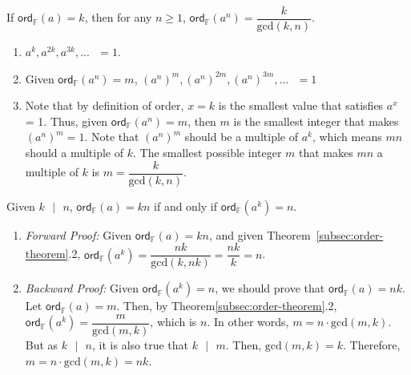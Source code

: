 \begin{tcolorbox}[title={\textbf{\tboxtheorem{\ref*{subsec:order-theorem}.2} Order Property (II)}}]
If $\textsf{ord}_{\mathbb{F}}(a) = k$, then for any $n \geq 1$, $\textsf{ord}_{\mathbb{F}}(a^n) = \dfrac{k} {\text{gcd}(k, n)}$.
\end{tcolorbox}
\begin{myproof}
    \begin{enumerate}
    \item $a^k, a^{2k}, a^{3k}, ... \text{ } = 1$. 
    \item Given $\textsf{ord}_{\mathbb{F}}(a^n) = m$, $(a^n)^m, (a^n)^{2m}, (a^n)^{3m}, ... \text{ } = 1$ 
    \item Note that by definition of order, $x=k$ is the smallest value that satisfies $a^x$ = 1. Thus, given $\textsf{ord}_{\mathbb{F}}(a^n) = m$, then $m$ is the smallest integer that makes $(a^n)^m = 1$. Note that $(a^n)^m$ should be a multiple of $a^k$, which means $mn$ should a multiple of $k$. The smallest possible integer $m$ that makes $mn$ a multiple of $k$ is $m = \dfrac{k}{\text{gcd}(k, n)}$. 
    \end{enumerate}
\end{myproof}

\begin{tcolorbox}[title={\textbf{\tboxtheorem{\ref*{subsec:order-theorem}.3} Order Property (III)}}]
Given $k \text{ } | \text{ } n$, $\textsf{ord}_{\mathbb{F}}(a) = kn$ if and only if $\textsf{ord}_{\mathbb{F}}(a^k) = n$.
\end{tcolorbox}
\begin{myproof}
\begin{enumerate}
    \item \textit{Forward Proof:} Given $\textsf{ord}_{\mathbb{F}}(a) = kn$, and given Theorem~\ref*{subsec:order-theorem}.2, $\textsf{ord}_{\mathbb{F}}(a^k) = \dfrac{nk}{\text{gcd}(k, nk)} = \dfrac{nk}{k} = n$.
    \item \textit{Backward Proof:} Given $\textsf{ord}_{\mathbb{F}}(a^k) = n$, we should prove that $\textsf{ord}_{\mathbb{F}}(a) = nk$. Let $\textsf{ord}_{\mathbb{F}}(a) = m$. Then, by Theorem\ref*{subsec:order-theorem}.2, $\textsf{ord}_{\mathbb{F}}(a^k) = \dfrac{m}{\text{gcd}(m, k)}$, which is $n$. In other words, $m = n \cdot \text{gcd}(m, k)$. But as $k \text{ } | \text{ } n$, it is also true that $k \text{ } | \text{ } m$. Then, $\text{gcd}(m, k) = k$. Therefore, $m = n \cdot \text{gcd}(m, k) = nk$.
\end{enumerate}
\end{myproof}

